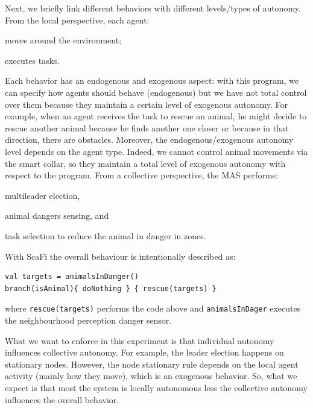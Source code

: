 \documentclass[jsan,article,accept,moreauthors,pdftex]{Definitions/mdpi}
\begin{document}
\begin{paracol}{2}
\switchcolumn



%
Next, we briefly link different 
 behaviors with different levels/types of autonomy. 
%
From the local perspective, each agent:
\begin{inlinelist}
\item moves around the environment;
\item executes tasks.
\end{inlinelist}
%
Each behavior has an endogenous and exogenous aspect: with this program, 
 we can specify how agents should behave (endogenous) but we have not total 
 control over them because they maintain a certain level of exogenous autonomy. 
%
For example, when an agent receives the task to rescue an animal, 
 he might decide to rescue another animal because he finds another one closer or
 because in that direction, there are obstacles. 
%
Moreover, the endogenous/exogenous autonomy level depends on the agent type. 
 Indeed, we cannot control animal movements via the smart collar, 
 so they maintain a total level of exogenous autonomy with respect to the program.
%
From a collective perspective, the MAS performs: 
\begin{inlinelist}
\item multileader election,
\item animal dangers sensing, and
\item task selection to reduce the animal in danger in zones.
\end{inlinelist}
%
With ScaFi the overall behaviour is intentionally described as:
\begin{lstlisting}
val targets = animalsInDanger()
branch(isAnimal){ doNothing } { rescue(targets) }
\end{lstlisting}
where \lstinline|rescue(targets)| performs the code above and \lstinline|animalsInDager|
  executes the neighbourhood perception danger sensor.

What we want to enforce in this experiment 
 is that individual autonomy influences collective autonomy.
%
For example, the leader election happens on stationary nodes. 
 However, the node stationary rule depends on the local agent 
 activity (mainly how they move), which is an exogenous behavior.
%
So, what we expect is that most the system is locally autonomous less 
 the collective autonomy influences the overall behavior.
%
%

\end{paracol}
\end{document}
